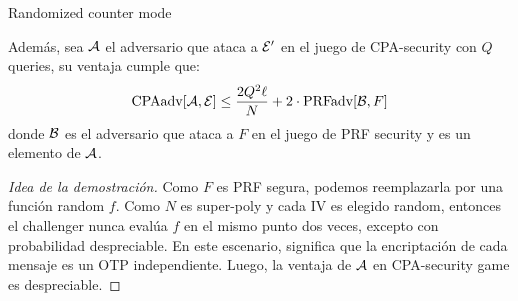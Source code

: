 \begin{frame}[allowframebreaks]{Randomized counter mode}
\begin{theorem}
    Además, sea $\mathcal{A}$ el adversario que ataca a $\mathcal{E}'$ en el juego de CPA-security con
    $Q$ queries, su ventaja cumple que:
    \begin{equation*}
      \text{CPAadv}[\mathcal{A}, \mathcal{E}] \leq \frac{2Q^2\ell}{N} + 2 \cdot \text{PRFadv}[\mathcal{B},F]
    \end{equation*}
    donde $\mathcal{B}$ es el adversario que ataca a $F$ en el juego de PRF security y es un 
    elemento de $\mathcal{A}$.
  \end{theorem}
  \begin{proof}[Idea de la demostración]
    Como $F$ es PRF segura, podemos reemplazarla por una función random $f$.
    Como $N$ es super-poly y cada IV es elegido random, entonces el challenger nunca evalúa 
    $f$ en el mismo punto dos veces, excepto con probabilidad despreciable.
    En este escenario, significa que la encriptación de cada mensaje es un OTP independiente.
    Luego, la ventaja de $\mathcal{A}$ en CPA-security game es despreciable.
  \end{proof}
\end{frame}

